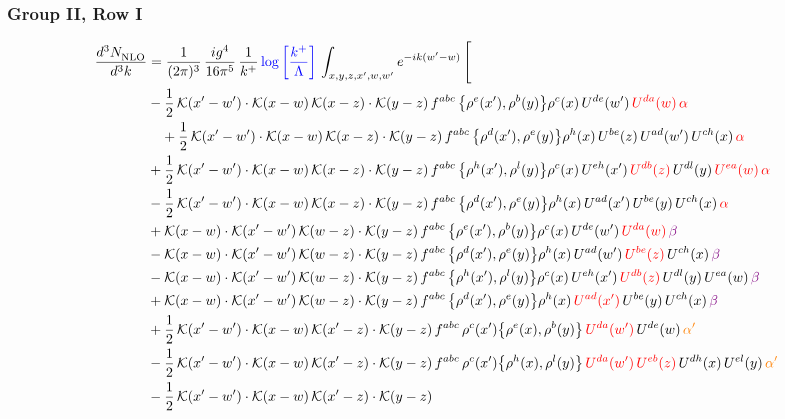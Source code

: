 \documentclass[9pt]{article}
\numberwithin{equation}{section}
\begin{document}
\subsubsection{Group II, Row I}
\begin{align}
     \frac{d^{3}N_{\rm NLO}^{\rm}}{d^{3}k}  & = \frac{1}{(2\pi)^{3}}\, \frac{ig^{4}}{16\pi^{5}}\, \frac{1}{k^{+}}\, {\color{blue}\log{\left[\frac{k^{+}}{\Lambda}\right]}}\, \int_{x,y,z,x^{\prime},w,w^{\prime}}e^{-ik(w^{\prime}-w)}\, \Bigg[\notag \\ & -\frac{1}{2}\,\mathcal{K}(x'-w')\cdot\mathcal{K}(x-w)\,\mathcal{K}(x-z)\cdot\mathcal{K}(y-z)\, f^{abc}\,\big\{\rho^{e}(x'),\rho^{b}(y)\big\}\rho^{c}(x)\,U^{de}(w')\,{\color{red}U^{da}(w)}\,{\color{red}\alpha}\notag \\ &\quad+\frac{1}{2}\,\mathcal{K}(x'-w')\cdot\mathcal{K}(x-w)\,\mathcal{K}(x-z)\cdot\mathcal{K}(y-z)\, f^{abc}\,\big\{\rho^{d}(x'),\rho^{e}(y)\big\}\rho^{h}(x)\,U^{be}(z)\,U^{ad}(w')\,U^{ch}(x)\,{\color{red}\alpha}\notag\\ & +\frac{1}{2}\,\mathcal{K}(x'-w')\cdot\mathcal{K}(x-w)\,\mathcal{K}(x-z)\cdot\mathcal{K}(y-z)\, f^{abc}\,\big\{\rho^{h}(x'),\rho^{l}(y)\big\}\rho^{c}(x)\,U^{eh}(x')\,{\color{red}U^{db}(z)}\,U^{dl}(y)\,{\color{red}U^{ea}(w)}\,{\color{red}\alpha}\notag \\ &-\frac{1}{2}\,\mathcal{K}(x'-w')\cdot\mathcal{K}(x-w)\,\mathcal{K}(x-z)\cdot\mathcal{K}(y-z)\, f^{abc}\,\big\{\rho^{d}(x'),\rho^{e}(y)\big\}\rho^{h}(x)\,U^{ad}(x')\,U^{be}(y)\,U^{ch}(x)\,{\color{red}\alpha}\notag\\ &+\mathcal{K}(x-w)\cdot\mathcal{K}(x'-w')\,\mathcal{K}(w-z)\cdot\mathcal{K}(y-z)\, f^{abc}\,\big\{\rho^{e}(x'),\rho^{b}(y)\big\}\rho^{c}(x)\,U^{de}(w')\,{\color{red}U^{da}(w)}\,{\color{violet}\beta}\notag\\ &-\mathcal{K}(x-w)\cdot\mathcal{K}(x'-w')\,\mathcal{K}(w-z)\cdot\mathcal{K}(y-z)\, f^{abc}\,\big\{\rho^{d}(x'),\rho^{e}(y)\big\}\rho^{h}(x)\,U^{ad}(w')\,{\color{red}U^{be}(z)}\,U^{ch}(x)\,{\color{violet}\beta}\notag \\ &-\mathcal{K}(x-w)\cdot\mathcal{K}(x'-w')\,\mathcal{K}(w-z)\cdot\mathcal{K}(y-z)\, f^{abc}\,\big\{\rho^{h}(x'),\rho^{l}(y)\big\}\rho^{c}(x)\,U^{eh}(x')\,{\color{red}U^{db}(z)}\,U^{dl}(y)\,U^{ea}(w)\,{\color{violet}\beta}\notag \\ & +\mathcal{K}(x-w)\cdot\mathcal{K}(x'-w')\,\mathcal{K}(w-z)\cdot\mathcal{K}(y-z)\, f^{abc}\,\big\{\rho^{d}(x'),\rho^{e}(y)\big\}\rho^{h}(x)\,{\color{red}U^{ad}(x')}\,U^{be}(y)\,U^{ch}(x)\,{\color{violet}\beta}\notag \\ &+\frac{1}{2}\,\mathcal{K}(x'-w')\cdot\mathcal{K}(x-w)\,\mathcal{K}(x'-z)\cdot\mathcal{K}(y-z)\, f^{abc}\,\rho^{c}(x')\big\{\rho^{e}(x),\rho^{b}(y)\big\}\,{\color{red}U^{da}(w')}\,U^{de}(w)\,{\color{orange}\alpha'}\notag \\ &-\frac{1}{2}\,\mathcal{K}(x'-w')\cdot\mathcal{K}(x-w)\,\mathcal{K}(x'-z)\cdot\mathcal{K}(y-z)\, f^{abc}\,\rho^{c}(x')\big\{\rho^{h}(x),\rho^{l}(y)\big\}\,{\color{red}U^{da}(w')}\,{\color{red}U^{eb}(z)}\,U^{dh}(x)\,U^{el}(y)\,{\color{orange}\alpha'}\notag \\ &-\frac{1}{2}\,\mathcal{K}(x'-w')\cdot\mathcal{K}(x-w)\,\mathcal{K}(x'-z)\cdot\mathcal{K}(y-z)\, 
\end{align}
\end{document}
